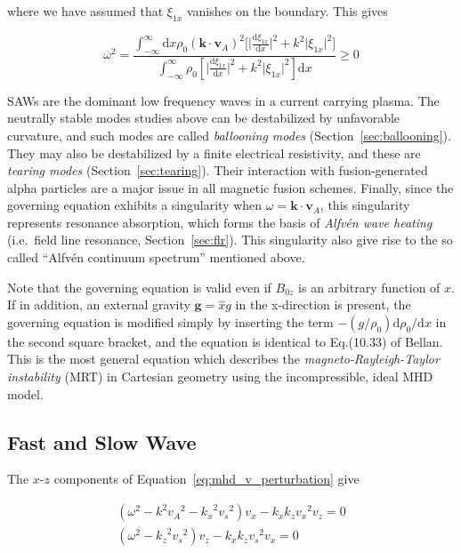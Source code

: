 \documentclass[
  notoc %
]{tufte-book}
\begin{document}
where we have assumed that \(\xi_{1x}\) vanishes on the boundary. This
gives

\[
\omega^2 = \frac{\int_{-\infty}^{\infty}\mathrm{d}x \rho_0 (\mathbf{k}\cdot\mathbf{v}_A)^2\Big[ \bigg\lvert \frac{\mathrm{d}\xi_{1x}}{\mathrm{d}x}\bigg\rvert^2 + k^2\lvert \xi_{1x}\rvert^2 \Big]}{\int_{-\infty}^{\infty}\rho_0[ \lvert \frac{\mathrm{d}\xi_{1x}}{\mathrm{d}x}\rvert^2 + k^2\lvert \xi_{1x}\rvert^2]\mathrm{d}x} \ge 0
\]

SAWs are the dominant low frequency waves in a current carrying plasma.
The neutrally stable modes studies above can be destabilized by
unfavorable curvature, and such modes are called \emph{ballooning modes}
(Section~\ref{sec:ballooning}). They may also be destabilized by a
finite electrical resistivity, and these are \emph{tearing modes}
(Section~\ref{sec:tearing}). Their interaction with fusion-generated
alpha particles are a major issue in all magnetic fusion schemes.
Finally, since the governing equation exhibits a singularity when
\(\omega=\mathbf{k}\cdot\mathbf{v}_A\), this singularity represents
resonance absorption, which forms the basis of \emph{Alfvén wave
heating} (i.e.~field line resonance, Section~\ref{sec:flr}). This
singularity also give rise to the so called ``Alfvén continuum
spectrum'' mentioned above.

Note that the governing equation is valid even if \(B_{0z}\) is an
arbitrary function of \(x\). If in addition, an external gravity
\(\mathbf{g}=\hat{x}g\) in the x-direction is present, the governing
equation is modified simply by inserting the term
\(-(g/\rho_0)\mathrm{d}\rho_0/\mathrm{d}x\) in the second square
bracket, and the equation is identical to Eq.(10.33) of Bellan. This is
the most general equation which describes the
\emph{magneto-Rayleigh-Taylor instability} (MRT) in Cartesian geometry
using the incompressible, ideal MHD model.

\hypertarget{sec:fast_slow}{%
\subsection{Fast and Slow Wave}\label{sec:fast_slow}}

The \(x\)-\(z\) components of Equation~\ref{eq:mhd_v_perturbation} give

\[
\begin{aligned}
(\omega^2-k^2{v_A}^2-{k_x}^2{v_s}^2)v_x -k_x k_z{v_x}^2v_z = 0 \\
(\omega^2-{k_z}^2{v_s}^2)v_z -k_x k_z{v_s}^2v_x=0
\end{aligned}
\]
\end{document}
